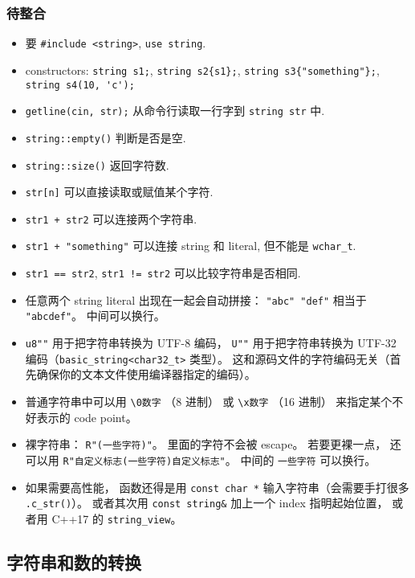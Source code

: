 
\begin{issues}
\issueDraft
\end{issues}

\subsubsection{待整合}
\begin{itemize}
\item 要 \verb`#include <string>`, \verb`use string`.
\item constructors: \verb`string s1;`, \verb`string s2{s1};`, \verb`string s3{"something"};`, \verb`string s4(10, 'c');`
\item \verb`getline(cin, str);` 从命令行读取一行字到 \verb`string str` 中.
\item \verb`string::empty()` 判断是否是空.
\item \verb`string::size()` 返回字符数.
\item \verb`str[n]` 可以直接读取或赋值某个字符.
\item \verb`str1 + str2` 可以连接两个字符串.
\item \verb`str1 + "something"` 可以连接 string 和 literal, 但不能是 \verb`wchar_t`.
\item \verb`str1 == str2`, \verb`str1 != str2` 可以比较字符串是否相同.
\item 任意两个 string literal 出现在一起会自动拼接： \verb`"abc" "def"` 相当于 \verb|"abcdef"|。 中间可以换行。
\item \verb|u8""| 用于把字符串转换为 UTF-8 编码， \verb|U""| 用于把字符串转换为 UTF-32 编码（\verb|basic_string<char32_t>| 类型）。 这和源码文件的字符编码无关（首先确保你的文本文件使用编译器指定的编码）。
\item 普通字符串中可以用 \verb|\0数字| （8 进制） 或 \verb|\x数字| （16 进制） 来指定某个不好表示的 code point。
\item 裸字符串： \verb|R"(一些字符)"|。 里面的字符不会被 escape。 若要更裸一点， 还可以用 \verb|R"自定义标志(一些字符)自定义标志"|。 中间的 \verb|一些字符| 可以换行。
\item 如果需要高性能， 函数还得是用 \verb|const char *| 输入字符串（会需要手打很多 \verb|.c_str()|）。 或者其次用 \verb|const string&| 加上一个 index 指明起始位置， 或者用 C++17 的 \verb|string_view|。
\end{itemize}

\subsection{字符串和数的转换}

